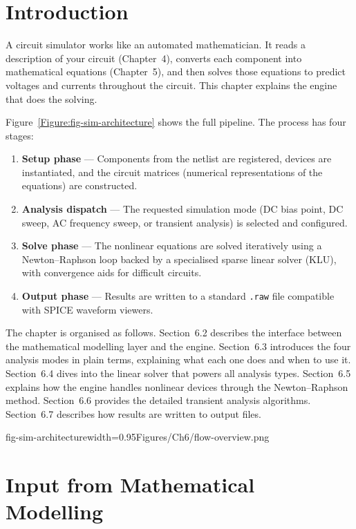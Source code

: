 \setlength{\parskip}{\baselineskip}

\section{Introduction}

A circuit simulator works like an automated mathematician. It reads a description of your circuit (Chapter~4), converts each component into mathematical equations (Chapter~5), and then solves those equations to predict voltages and currents throughout the circuit. This chapter explains the engine that does the solving.

Figure~\ref{Figure:fig-sim-architecture} shows the full pipeline. The process has four stages:
\begin{enumerate}
  \item \textbf{Setup phase} --- Components from the netlist are registered, devices are instantiated, and the circuit matrices (numerical representations of the equations) are constructed.
  \item \textbf{Analysis dispatch} --- The requested simulation mode (DC bias point, DC sweep, AC frequency sweep, or transient analysis) is selected and configured.
  \item \textbf{Solve phase} --- The nonlinear equations are solved iteratively using a Newton--Raphson loop backed by a specialised sparse linear solver (KLU), with convergence aids for difficult circuits.
  \item \textbf{Output phase} --- Results are written to a standard \texttt{.raw} file compatible with SPICE waveform viewers.
\end{enumerate}

The chapter is organised as follows. Section~6.2 describes the interface between the mathematical modelling layer and the engine. Section~6.3 introduces the four analysis modes in plain terms, explaining what each one does and when to use it. Section~6.4 dives into the linear solver that powers all analysis types. Section~6.5 explains how the engine handles nonlinear devices through the Newton--Raphson method. Section~6.6 provides the detailed transient analysis algorithms. Section~6.7 describes how results are written to output files.

  {fig-sim-architecture}{width=0.95\textwidth}{Figures/Ch6/flow-overview.png}

\section{Input from Mathematical Modelling}

